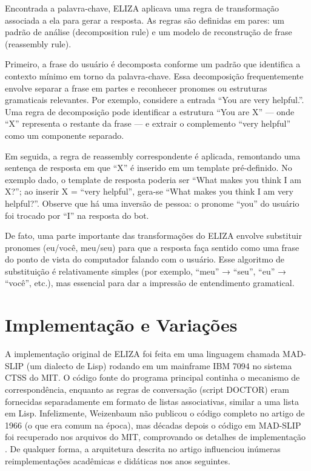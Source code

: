 \documentclass[14pt,a4paper,oneside]{book}
\begin{document}
Encontrada a palavra-chave, ELIZA aplicava uma regra de transformação associada a ela para gerar a resposta. As regras são definidas em pares: um padrão de análise (decomposition rule) e um modelo de reconstrução de frase (reassembly rule).

Primeiro, a frase do usuário é decomposta conforme um padrão que identifica a contexto mínimo em torno da palavra-chave. Essa decomposição frequentemente envolve separar a frase em partes e reconhecer pronomes ou estruturas gramaticais relevantes. Por exemplo, considere a entrada “You are very helpful.”. Uma regra de decomposição pode identificar a estrutura “You are X” — onde “X” representa o restante da frase — e extrair o complemento “very helpful” como um componente separado.

Em seguida, a regra de reassembly correspondente é aplicada, remontando uma sentença de resposta em que “X” é inserido em um template pré-definido. No exemplo dado, o template de resposta poderia ser “What makes you think I am X?”; ao inserir X = “very helpful”, gera-se “What makes you think I am very helpful?”. Observe que há uma inversão de pessoa: o pronome “you” do usuário foi trocado por “I” na resposta do bot.

De fato, uma parte importante das transformações do ELIZA envolve substituir pronomes (eu/você, meu/seu) para que a resposta faça sentido como uma frase do ponto de vista do computador falando com o usuário. Esse algoritmo de substituição é relativamente simples (por exemplo, “meu” → “seu”, “eu” → “você”, etc.), mas essencial para dar a impressão de entendimento gramatical.

\section{Implementação e Variações}

A implementação original de ELIZA foi feita em uma linguagem chamada MAD-SLIP (um dialecto de Lisp) rodando em um mainframe IBM 7094 no sistema CTSS do MIT. O código fonte do programa principal continha o mecanismo de correspondência, enquanto as regras de conversação (script DOCTOR) eram fornecidas separadamente em formato de listas associativas, similar a uma lista em Lisp. Infelizmente, Weizenbaum não publicou o código completo no artigo de 1966 (o que era comum na época), mas décadas depois o código em MAD-SLIP foi recuperado nos arquivos do MIT, comprovando os detalhes de implementação \cite{Lane2025}. De qualquer forma, a arquitetura descrita no artigo influenciou inúmeras reimplementações acadêmicas e didáticas nos anos seguintes.
\end{document}
